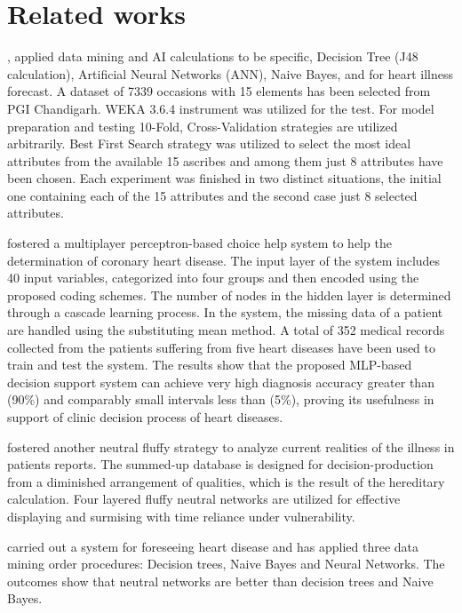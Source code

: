\section{Related works}{
\setlength{\parskip}{1em}

\citealp{taneja2013heart}, applied data mining and AI calculations to be specific, Decision Tree (J48 calculation), Artificial Neural Networks (ANN), Naive Bayes, and for heart illness forecast. A dataset of 7339 occasions with 15 elements has been selected from PGI Chandigarh. WEKA 3.6.4 instrument was utilized for the test. For model preparation and testing 10-Fold, Cross-Validation strategies are utilized arbitrarily. Best First Search strategy was utilized to select the most ideal attributes from the available 15 ascribes and among them just 8 attributes have been chosen. Each experiment was finished in two distinct situations, the initial one containing each of the 15 attributes and the second case just 8 selected attributes.

\citealp{yan2006multilayer} fostered a multiplayer perceptron-based choice help system to help the determination of coronary heart disease. The input layer of the system includes 40 input variables, categorized into four groups and then encoded using the proposed coding schemes. The number of nodes in the hidden layer is determined through a cascade learning process. In the system, the missing data of a patient are handled using the substituting mean method. A total of 352 medical records collected from the patients suffering from five heart diseases have been used to train and test the system. The results show that the proposed MLP-based decision support system can achieve very high diagnosis accuracy greater than (90\%) and comparably small intervals less than (5\%), proving its usefulness in support of clinic decision process of heart diseases.

\citealp{setthukkarase2012intelligent} fostered another neutral fluffy strategy to analyze current realities of the illness in patients reports. The summed-up database is designed for decision-production from a diminished arrangement of qualities, which is the result of the hereditary calculation. Four layered fluffy neutral networks are utilized for effective displaying and surmising with time reliance under vulnerability.

\citealp{dangare2012improved} carried out a system for foreseeing heart disease and has applied three data mining order procedures: Decision trees, Naive Bayes and Neural Networks. The outcomes show that neutral networks are better than decision trees and Naive Bayes.

}
